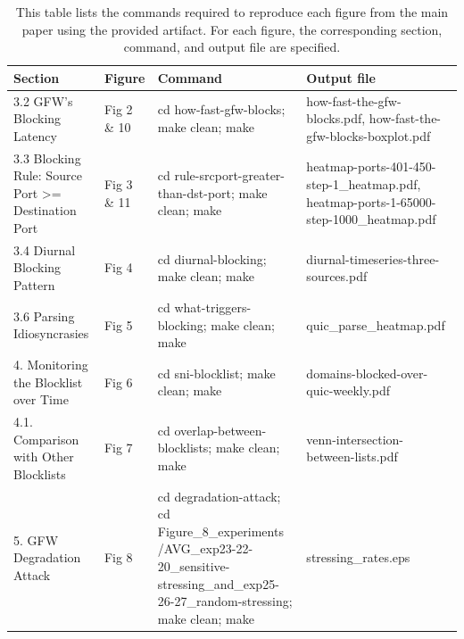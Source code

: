 
\begin{table}[t]
    \centering
    \small
    \begin{tabularx}{\linewidth}{|X|X|X|X|} 
        \hline
    \textbf{Section} & \textbf{Figure} & \textbf{Command} & \textbf{Output file} \\

    \hline
    3.2 GFW's Blocking Latency & Fig 2 \& 10 & cd how-fast-gfw-blocks; make clean; make & how-fast-the-gfw-blocks.pdf, how-fast-the-gfw-blocks-boxplot.pdf \\
    \hline
    3.3 Blocking Rule: Source Port \textgreater{}= Destination Port & Fig 3 \& 11 & cd rule-srcport-greater-than-dst-port; make clean; make & heatmap-ports-401-450-step-1\_heatmap.pdf, heatmap-ports-1-65000-step-1000\_heatmap.pdf \\
    \hline
    3.4 Diurnal Blocking Pattern & Fig 4 & cd diurnal-blocking; make clean; make & diurnal-timeseries-three-sources.pdf \\
    \hline
    3.6 Parsing Idiosyncrasies & Fig 5 & cd what-triggers-blocking; make clean; make & quic\_parse\_heatmap.pdf \\
    \hline
    4. Monitoring the Blocklist over Time & Fig 6 & cd sni-blocklist; make clean; make & domains-blocked-over-quic-weekly.pdf \\
    \hline
    4.1. Comparison with Other Blocklists & Fig 7 & cd overlap-between-blocklists; make clean; make & venn-intersection-between-lists.pdf \\
    \hline
    5. GFW Degradation Attack & Fig 8 & \small{cd degradation-attack; cd Figure\_8\_experiments /AVG\_exp23-22-20\_sensitive-stressing\_and\_exp25-26-27\_random-stressing; make clean; make} & stressing\_rates.eps \\
    \hline
    \end{tabularx}
    \label{tab:t1}

    \caption{This table lists the commands required to reproduce each figure from the main paper using the provided artifact. For each figure, the corresponding section, command, and output file are specified.}
\end{table}




